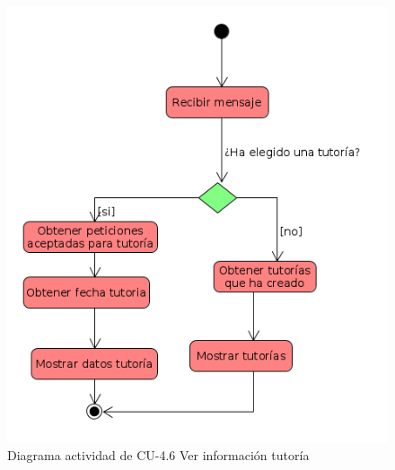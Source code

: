         \begin{figure}[!ht] %
\centering
\includegraphics[scale=0.5]{imagenes/diagramas/actividad/cola_tutorias.png}  %

\caption{Diagrama actividad  de CU-4.6 Ver información tutoría}\label{figura145}
\end{figure}



